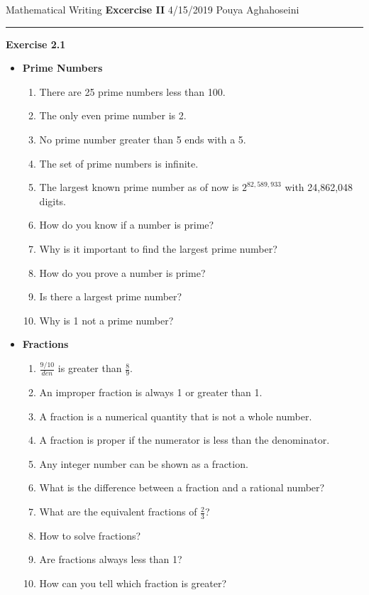 \documentclass{article}
\begin{document}
\noindent
Mathematical Writing \hfill \textbf{Excercise II} \newline 
{4/15/2019} \hfill Pouya Aghahoseini

\noindent
\rule{\linewidth}{0.4pt}
\textbf{\large\color{blue} Exercise 2.1}
\begin{itemize}
	\item \textbf{Prime Numbers}
	\begin{enumerate}
		\item 
		There are 25 prime numbers less than 100.
		\item
		The only even prime number is 2.
		\item 
		No prime number greater than 5 ends with a 5.
		\item 
		The set of prime numbers is infinite.
		\item 
		The largest known prime number as of now is $2^{82,589,933}$ with 24,862,048 digits.
		\item 
		How do you know if a number is prime?
		\item 
		Why is it important to find the largest prime number?
		\item 
		How do you prove a number is prime?
		\item 
		Is there a largest prime number?
		\item 
		Why is 1 not a prime number?
	\end{enumerate}
	\item \textbf{Fractions}
	\begin{enumerate}
		\item 
		$\frac{9/10}{den}$ is greater than $\frac{8}{9}$.
		\item 
		An improper fraction is always 1 or greater than 1.
		\item 
		 A fraction is a numerical quantity that is not a whole number.
		\item 
		 A fraction is proper if the numerator is less than the denominator.
		\item 
		Any integer number can be shown as a fraction.
		\item 
		What is the difference between a fraction and a rational number?
		\item 
		What are the equivalent fractions of $\frac{2}{3}$?
		\item 
		How to solve fractions?
		\item 
		Are fractions always less than 1?
		\item
		How can you tell which fraction is greater?
	\end{enumerate}

\end{itemize}
\end{document}
